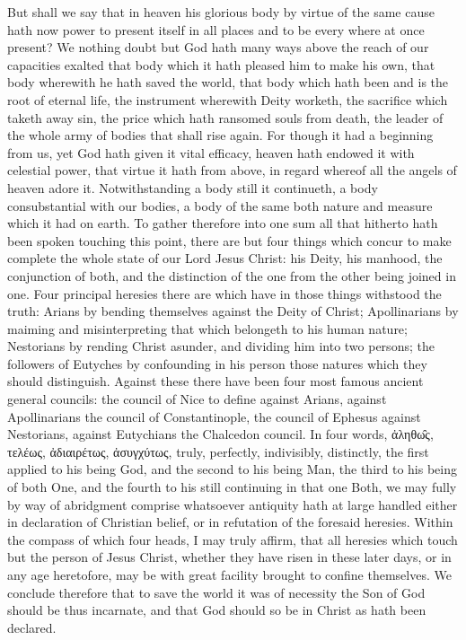 But shall we say that in heaven his glorious body by virtue of the same cause hath now power to present itself in all places and to be every where at once present? We nothing doubt but God hath many ways above the reach of our capacities exalted that body which it hath pleased him to make his own, that body wherewith he hath saved the world, that body which hath been and is the root of eternal life, the instrument wherewith Deity worketh, the sacrifice which taketh away sin, the price which hath ransomed souls from death, the leader of the whole army of bodies that shall rise again. For though it had a beginning from us, yet God hath given it vital efficacy, heaven hath endowed it with celestial power, that virtue it hath from above, in regard whereof all the angels of heaven adore it. Notwithstanding a body still it continueth, a body consubstantial with our bodies, a body of the same both nature and measure which it had on earth.
To gather therefore into one sum all that hitherto hath been spoken touching this point, there are but four things which concur to make complete the whole state of our Lord Jesus Christ: his Deity, his manhood, the conjunction of both, and the distinction of the one from the other being joined in one. Four principal heresies there are which have in those things withstood the truth: Arians by bending themselves against the Deity of Christ; Apollinarians by maiming and misinterpreting that which belongeth to his human nature; Nestorians by rending Christ asunder, and  dividing him into two persons; the followers of Eutyches by confounding in his person those natures which they should distinguish. Against these there have been four most famous ancient general councils: the council of Nice to define against Arians, against Apollinarians the council of Constantinople, the council of Ephesus against Nestorians, against Eutychians the Chalcedon council. In four words, ἀληθω̑ς, τελέως, ἀδιαιρέτως, ἀσυγχύτως, truly, perfectly, indivisibly, distinctly, the first applied to his being God, and the second to his being Man, the third to his being of both One, and the fourth to his still continuing in that one Both, we may fully by way of abridgment comprise whatsoever antiquity hath at large handled either in declaration of Christian belief, or in refutation of the foresaid heresies. Within the compass of which four heads, I may truly affirm, that all heresies which touch but the person of Jesus Christ, whether they have risen in these later days, or in any age heretofore, may be with great facility brought to confine themselves.
We conclude therefore that to save the world it was of necessity the Son of God should be thus incarnate, and that God should so be in Christ as hath been declared.

